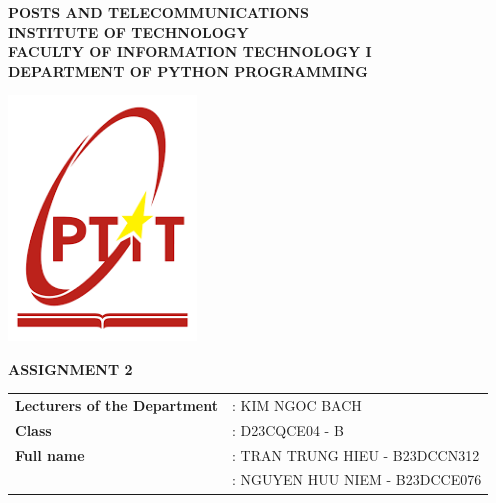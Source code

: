\documentclass[12pt]{article}
\begin{document}
\begin{titlepage}
    \centering %

    {\large\bfseries POSTS AND TELECOMMUNICATIONS\\[0.2cm] INSTITUTE OF TECHNOLOGY} \\[0.5cm] 
    {\large\bfseries FACULTY OF INFORMATION TECHNOLOGY I} \\[0.5cm] %
    {\normalsize\bfseries DEPARTMENT OF PYTHON PROGRAMMING} \\[2cm] %

    

    \begin{center}
    \includegraphics[width=5cm]{Screenshots/image1 .png} %
    \end{center}
    \vspace{0.5cm} %
    {\Huge\bfseries ASSIGNMENT 2} \\[2.5cm]
    

    \begin{flushleft} %
    \large %
    \begin{tabular}{ll} %
    \textbf{Lecturers of the Department} & : KIM NGOC BACH \\
    \textbf{Class} & : D23CQCE04 - B \\
    \textbf{Full name} & : TRAN TRUNG HIEU - B23DCCN312 \\ %
    & : NGUYEN HUU NIEM - B23DCCE076 \\ %
    \end{tabular}
    \end{flushleft}
    \vspace{1cm} %


\end{titlepage}
\end{document}
